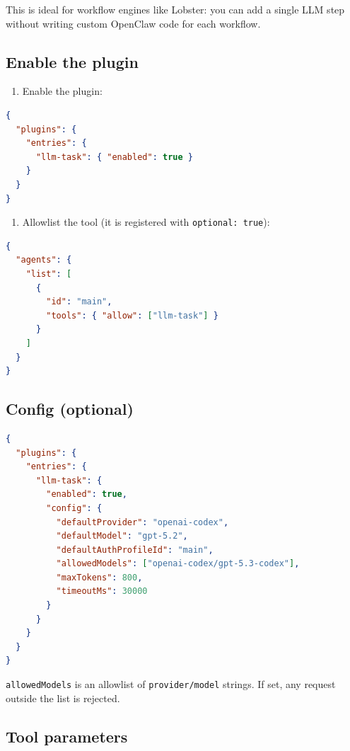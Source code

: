 This is ideal for workflow engines like Lobster: you can add a single LLM step
without writing custom OpenClaw code for each workflow.

\subsection{Enable the plugin}


\begin{enumerate}
  \item Enable the plugin:
\end{enumerate}


\begin{lstlisting}[language=json]
{
  "plugins": {
    "entries": {
      "llm-task": { "enabled": true }
    }
  }
}
\end{lstlisting}


\begin{enumerate}
  \item Allowlist the tool (it is registered with \texttt{optional: true}):
\end{enumerate}


\begin{lstlisting}[language=json]
{
  "agents": {
    "list": [
      {
        "id": "main",
        "tools": { "allow": ["llm-task"] }
      }
    ]
  }
}
\end{lstlisting}


\subsection{Config (optional)}


\begin{lstlisting}[language=json]
{
  "plugins": {
    "entries": {
      "llm-task": {
        "enabled": true,
        "config": {
          "defaultProvider": "openai-codex",
          "defaultModel": "gpt-5.2",
          "defaultAuthProfileId": "main",
          "allowedModels": ["openai-codex/gpt-5.3-codex"],
          "maxTokens": 800,
          "timeoutMs": 30000
        }
      }
    }
  }
}
\end{lstlisting}


\texttt{allowedModels} is an allowlist of \texttt{provider/model} strings. If set, any request
outside the list is rejected.

\subsection{Tool parameters}


